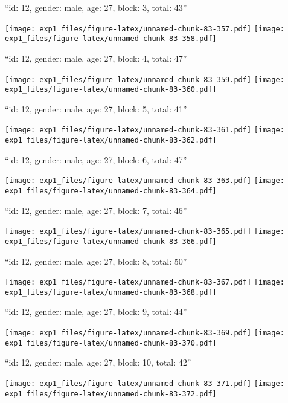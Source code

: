 \documentclass[11pt,,]{article}
\begin{document}
\newpage
[1] 

``id: 12, gender: male, age: 27, block: 3, total: 43''

\texttt{[image: exp1\_files/figure-latex/unnamed-chunk-83-357.pdf]}
\texttt{[image: exp1\_files/figure-latex/unnamed-chunk-83-358.pdf]}

\newpage
[1] 

``id: 12, gender: male, age: 27, block: 4, total: 47''

\texttt{[image: exp1\_files/figure-latex/unnamed-chunk-83-359.pdf]}
\texttt{[image: exp1\_files/figure-latex/unnamed-chunk-83-360.pdf]}

\newpage
[1] 

``id: 12, gender: male, age: 27, block: 5, total: 41''

\texttt{[image: exp1\_files/figure-latex/unnamed-chunk-83-361.pdf]}
\texttt{[image: exp1\_files/figure-latex/unnamed-chunk-83-362.pdf]}

\newpage
[1] 

``id: 12, gender: male, age: 27, block: 6, total: 47''

\texttt{[image: exp1\_files/figure-latex/unnamed-chunk-83-363.pdf]}
\texttt{[image: exp1\_files/figure-latex/unnamed-chunk-83-364.pdf]}

\newpage
[1] 

``id: 12, gender: male, age: 27, block: 7, total: 46''

\texttt{[image: exp1\_files/figure-latex/unnamed-chunk-83-365.pdf]}
\texttt{[image: exp1\_files/figure-latex/unnamed-chunk-83-366.pdf]}

\newpage
[1] 

``id: 12, gender: male, age: 27, block: 8, total: 50''

\texttt{[image: exp1\_files/figure-latex/unnamed-chunk-83-367.pdf]}
\texttt{[image: exp1\_files/figure-latex/unnamed-chunk-83-368.pdf]}

\newpage
[1] 

``id: 12, gender: male, age: 27, block: 9, total: 44''

\texttt{[image: exp1\_files/figure-latex/unnamed-chunk-83-369.pdf]}
\texttt{[image: exp1\_files/figure-latex/unnamed-chunk-83-370.pdf]}

\newpage
[1] 

``id: 12, gender: male, age: 27, block: 10, total: 42''

\texttt{[image: exp1\_files/figure-latex/unnamed-chunk-83-371.pdf]}
\texttt{[image: exp1\_files/figure-latex/unnamed-chunk-83-372.pdf]}
\end{document}
